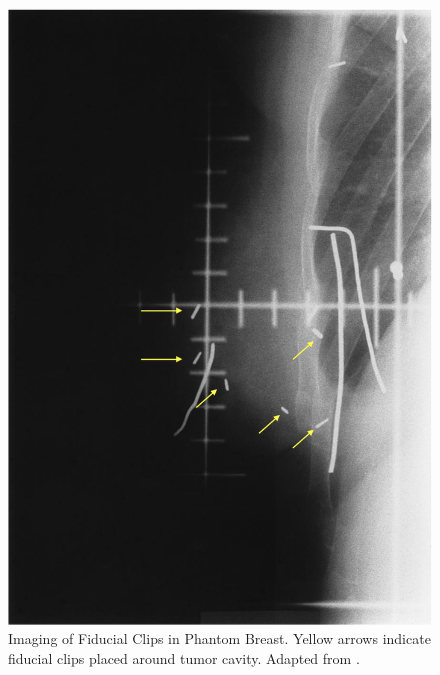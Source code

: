 \begin{figure}[H]
        \centering
        \includegraphics[height=0.3\textheight]{../figs/introduction/imaging_of_fiducal_clips_in_phantom_breast.png}
        \caption{Imaging of Fiducial Clips in Phantom Breast. Yellow arrows indicate fiducial clips placed around tumor cavity. Adapted from \cite{RefWorks:RefID:178-krawczyk1994importance}.}
        \label{fig:literatureReview:imaging_of_fiducal_clips_in_phantom_breast}
\end{figure}

